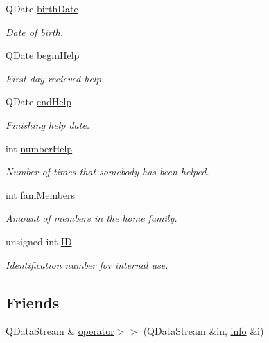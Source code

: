 \begin{DoxyCompactItemize}
Q\+Date \hyperlink{struct_person_1_1info_a803a2ee586aaa2503e10447b1435e916}{birth\+Date}
\begin{DoxyCompactList}\small\item\em Date of birth. \end{DoxyCompactList}\item 
Q\+Date \hyperlink{struct_person_1_1info_a835c907e641433331e06c62bcde9dfe9}{begin\+Help}
\begin{DoxyCompactList}\small\item\em First day recieved help. \end{DoxyCompactList}\item 
Q\+Date \hyperlink{struct_person_1_1info_acc738154c5e01adc22c880fc49d6e09c}{end\+Help}
\begin{DoxyCompactList}\small\item\em Finishing help date. \end{DoxyCompactList}\item 
int \hyperlink{struct_person_1_1info_a6fd0e334bf6cc9baf667ef94806ed993}{number\+Help}
\begin{DoxyCompactList}\small\item\em Number of times that somebody has been helped. \end{DoxyCompactList}\item 
int \hyperlink{struct_person_1_1info_afc121f83e810c2c0318e115f4ba6d730}{fam\+Members}
\begin{DoxyCompactList}\small\item\em Amount of members in the home family. \end{DoxyCompactList}\item 
unsigned int \hyperlink{struct_person_1_1info_a535ca27747d371eb58005194190f6bd6}{I\+D}
\begin{DoxyCompactList}\small\item\em Identification number for internal use. \end{DoxyCompactList}\end{DoxyCompactItemize}
\subsection*{Friends}
\begin{DoxyCompactItemize}
\item 
Q\+Data\+Stream \& \hyperlink{struct_person_1_1info_aa1cff6f546458f788536a635780f7014}{operator$>$$>$} (Q\+Data\+Stream \&in, \hyperlink{struct_person_1_1info}{info} \&i)
\end{DoxyCompactItemize}


